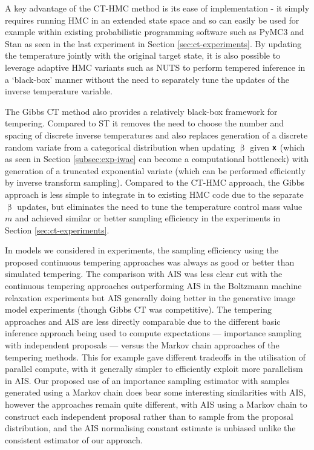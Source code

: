 A key advantage of the \ac{CT-HMC} method is its ease of implementation - it simply requires running \ac{HMC} in an extended state space and so can easily be used for example within existing probabilistic programming software such as PyMC3 \citep{salvatier2016probabilistic} and Stan \citep{carpenter2016stan} as seen in the last experiment in Section \ref{sec:ct-experiments}. By updating the temperature jointly with the original target state, it is also possible to leverage adaptive \ac{HMC} variants such as \ac{NUTS} \citep{hoffman2014no} to perform tempered inference in a `black-box' manner without the need to separately tune the updates of the inverse temperature variable.

The Gibbs \ac{CT} method also provides a relatively black-box framework for tempering. Compared to \ac{ST} it removes the need to choose the number and spacing of discrete inverse temperatures and also replaces generation of a discrete random variate from a categorical distribution when updating $\upbeta$ given $\boldsymbol{\mathsf{x}}$ (which as seen in Section \ref{subsec:exp-iwae} can become a computational bottleneck) with generation of a truncated exponential variate (which can be performed efficiently by inverse transform sampling). Compared to the \ac{CT-HMC} approach, the Gibbs approach is less simple to integrate in to existing \ac{HMC} code due to the separate $\upbeta$ updates, but eliminates the need to tune the temperature control mass value $m$ and achieved similar or better sampling efficiency in the experiments in Section \ref{sec:ct-experiments}.

In models we considered in experiments, the sampling efficiency using the proposed continuous tempering approaches was always as good or better than simulated tempering. The comparison with \ac{AIS} was less clear cut with the continuous tempering approaches outperforming \ac{AIS} in the Boltzmann machine relaxation experiments but \ac{AIS} generally doing better in the generative image model experiments (though Gibbs \ac{CT} was competitive). The tempering approaches and \ac{AIS} are less directly comparable due to the different basic inference approach being used to compute expectations --- importance sampling with independent proposals --- versus the Markov chain approaches of the tempering methods. This for example gave different tradeoffs in the utilisation of parallel compute, with it generally simpler to efficiently exploit more parallelism in \ac{AIS}. Our proposed use of an importance sampling estimator with samples generated using a Markov chain does bear some interesting similarities with \ac{AIS}, however the approaches remain quite different, with \ac{AIS} using a Markov chain to construct each independent proposal rather than to sample from the proposal distribution, and the \ac{AIS} normalising constant estimate is unbiased unlike the consistent estimator of our approach.


